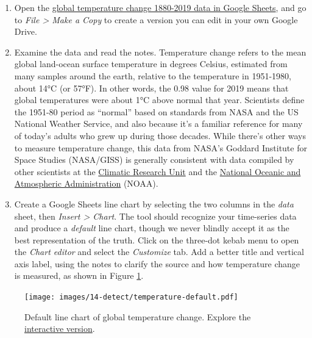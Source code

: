 \documentclass[
  english,
]{book}
\begin{document}
\begin{enumerate}
\def\labelenumi{\arabic{enumi}.}
\item
  Open the \href{https://docs.google.com/spreadsheets/d/1Npc7ozRjlsgRLLEV_B5zBvqyRqL6akE2qrEIGegHfGU/edit\#gid=0}{global temperature change 1880-2019 data in Google Sheets}, and go to \emph{File \textgreater{} Make a Copy} to create a version you can edit in your own Google Drive.
\item
  Examine the data and read the notes. Temperature change refers to the mean global land-ocean surface temperature in degrees Celsius, estimated from many samples around the earth, relative to the temperature in 1951-1980, about 14°C (or 57°F). In other words, the 0.98 value for 2019 means that global temperatures were about 1°C above normal that year. Scientists define the 1951-80 period as ``normal'' based on standards from NASA and the US National Weather Service, and also because it's a familiar reference for many of today's adults who grew up during those decades. While there's other ways to measure temperature change, this data from NASA's Goddard Institute for Space Studies (NASA/GISS) is generally consistent with data compiled by other scientists at the \href{https://sites.uea.ac.uk/cru/}{Climatic Research Unit} and the \href{https://www.ncdc.noaa.gov/cag/global/time-series}{National Oceanic and Atmospheric Administration} (NOAA).
\item
  Create a Google Sheets line chart by selecting the two columns in the \emph{data} sheet, then \emph{Insert \textgreater{} Chart}. The tool should recognize your time-series data and produce a \emph{default} line chart, though we never blindly accept it as the best representation of the truth. Click on the three-dot kebab menu to open the \emph{Chart editor} and select the \emph{Customize} tab. Add a better title and vertical axis label, using the notes to clarify the source and how temperature change is measured, as shown in Figure \ref{fig:temperature-default}.
\end{enumerate}



\begin{figure}
\centering
\texttt{[image: images/14-detect/temperature-default.pdf]}
\caption{\label{fig:temperature-default}Default line chart of global temperature change. Explore the \href{https://docs.google.com/spreadsheets/d/e/2PACX-1vRBJy0vWBN1z49hE8c7vxF_ZiTNKF5RjQ2vpJ-aVfsdNpNYgcMu1cH2zAh90v713vcMmrs6kVlSgQkV/pubchart?oid=557710802\&format=interactive}{interactive version}.}
\end{figure}
\end{document}
